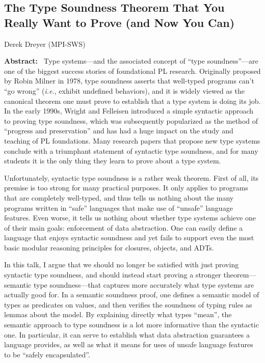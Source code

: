 \label{Keynotes}

\def\talktitle#1{\subsection*{#1}}
\def\speaker#1#2{\begin{flushleft} #1 (#2) \end{flushleft}}
\def\talkabstract{\noindent \textbf{Abstract:}~}
\def\bio{\medskip\noindent \textbf{Bio:}~}

\talktitle{The Type Soundness Theorem That You Really Want to Prove (and Now You Can)}

\speaker{Derek Dreyer}{MPI-SWS}

\talkabstract
Type systems—and the associated concept of “type soundness”—are one of the
biggest success stories of foundational PL research. Originally proposed by
Robin Milner in 1978, type soundness asserts that well-typed programs can’t “go
wrong” (\emph{i.e.}, exhibit undefined behaviors), and it is widely viewed as the
canonical theorem one must prove to establish that a type system is doing its
job. In the early 1990s, Wright and Felleisen introduced a simple syntactic
approach to proving type soundness, which was subsequently popularized as the
method of ``progress and preservation'' and has had a huge impact on the study and
teaching of PL foundations. Many research papers that propose new type systems
conclude with a triumphant statement of syntactic type soundness, and for many
students it is the only thing they learn to prove about a type system.

Unfortunately, syntactic type soundness is a rather weak theorem. First of all,
its premise is too strong for many practical purposes. It only applies to
programs that are completely well-typed, and thus tells us nothing about the
many programs written in ``safe'' languages that make use of ``unsafe'' language
features. Even worse, it tells us nothing about whether type systems achieve one
of their main goals: enforcement of data abstraction. One can easily define a
language that enjoys syntactic soundness and yet fails to support even the most
basic modular reasoning principles for closures, objects, and ADTs.

In this talk, I argue that we should no longer be satisfied with just proving
syntactic type soundness, and should instead start proving a stronger
theorem—semantic type soundness—that captures more accurately what type systems
are actually good for. In a semantic soundness proof, one defines a semantic
model of types as predicates on values, and then verifies the soundness of
typing rules as lemmas about the model. By explaining directly what types
``mean'', the semantic approach to type soundness is a lot more informative than
the syntactic one. In particular, it can serve to establish what data
abstraction guarantees a language provides, as well as what it means for uses of
unsafe language features to be ``safely encapsulated''.

